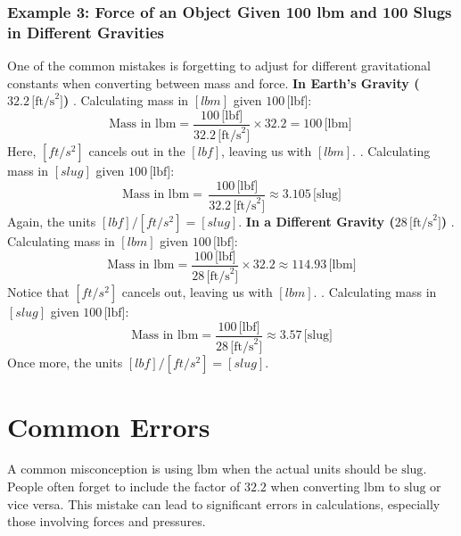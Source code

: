 \documentclass[12pt]{article}
\begin{document}
\newpage
\subsubsection*{Example 3: Force of an Object Given 100 lbm and 100 Slugs in Different Gravities}

One of the common mistakes is forgetting to adjust for different gravitational constants when converting between mass and force.
\newline \newline
\textbf{In Earth's Gravity (\( 32.2 \, \text{[ft/s}^2] \))}
. Calculating mass in \([lbm]\) given \( 100 \, \text{[lbf]} \):
\[
\text{Mass in lbm} = \frac{100 \, \text{[lbf]}}{32.2 \, \text{[ft/s}^2]} \times 32.2 = 100 \, \text{[lbm]} \
\]
Here, \([ft/s^2]\) cancels out in the \([lbf]\), leaving us with \( [lbm] \). 
\newline
{}. Calculating mass in \([slug]\) given \( 100 \, \text{[lbf]} \):
\[
\text{Mass in lbm} = \, \frac{100 \, \text{[lbf]}}{32.2 \, \text{[ft/s}^2]} \approx 3.105 \, \text{[slug]} 
\]
Again, the units \([lbf] / [ft/s^2] = [slug]\).
\newline\newline
\textbf{In a Different Gravity (\( 28 \, \text{[ft/s}^2] \))}
. Calculating mass in \([lbm]\) given \( 100 \, \text{[lbf]} \):
\[
\text{Mass in lbm} = \frac{100 \, \text{[lbf]}}{28 \, \text{[ft/s}^2]} \times 32.2 \approx 114.93 \, \text{[lbm]} 
\]
Notice that \([ft/s^2]\) cancels out, leaving us with \( [lbm] \).
\newline{}. Calculating mass in \([slug]\) given \( 100 \, \text{[lbf]} \):
\[
\text{Mass in lbm} = \frac{100 \, \text{[lbf]}}{28 \, \text{[ft/s}^2]} \approx 3.57 \, \text{[slug]}
\]
Once more, the units \([lbf] / [ft/s^2] = [slug]\).


\section*{Common Errors}
A common misconception is using \(\text{lbm}\) when the actual units should be \(\text{slug}\). People often forget to include the factor of \(32.2\) when converting \(\text{lbm}\) to \(\text{slug}\) or vice versa. This mistake can lead to significant errors in calculations, especially those involving forces and pressures.
\end{document}
